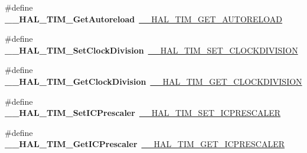 \begin{DoxyCompactItemize}
\item 
\mbox{\label{group___h_a_l___t_i_m___aliased___macros_gae96afd3a280ee1faf2551537e6618ee4}} 
\#define {\bfseries \+\_\+\+\_\+\+H\+A\+L\+\_\+\+T\+I\+M\+\_\+\+Get\+Autoreload}~\mbox{\hyperlink{group___t_i_m___exported___macros_gaa7a5c7645695bad15bacd402513a028a}{\+\_\+\+\_\+\+H\+A\+L\+\_\+\+T\+I\+M\+\_\+\+G\+E\+T\+\_\+\+A\+U\+T\+O\+R\+E\+L\+O\+AD}}
\item 
\mbox{\label{group___h_a_l___t_i_m___aliased___macros_ga8b8f3cf144c4058ec55e6e3659c6a68f}} 
\#define {\bfseries \+\_\+\+\_\+\+H\+A\+L\+\_\+\+T\+I\+M\+\_\+\+Set\+Clock\+Division}~\mbox{\hyperlink{group___t_i_m___exported___macros_ga8aa84d77c670890408092630f9b2bdc4}{\+\_\+\+\_\+\+H\+A\+L\+\_\+\+T\+I\+M\+\_\+\+S\+E\+T\+\_\+\+C\+L\+O\+C\+K\+D\+I\+V\+I\+S\+I\+ON}}
\item 
\mbox{\label{group___h_a_l___t_i_m___aliased___macros_gaaf835e3864f2ba2e2026d417ad0d5e40}} 
\#define {\bfseries \+\_\+\+\_\+\+H\+A\+L\+\_\+\+T\+I\+M\+\_\+\+Get\+Clock\+Division}~\mbox{\hyperlink{group___t_i_m___exported___macros_gae6bc91bb5940bce52828c690f24001b8}{\+\_\+\+\_\+\+H\+A\+L\+\_\+\+T\+I\+M\+\_\+\+G\+E\+T\+\_\+\+C\+L\+O\+C\+K\+D\+I\+V\+I\+S\+I\+ON}}
\item 
\mbox{\label{group___h_a_l___t_i_m___aliased___macros_ga1cb3c9854441539ebe076fba62c36d22}} 
\#define {\bfseries \+\_\+\+\_\+\+H\+A\+L\+\_\+\+T\+I\+M\+\_\+\+Set\+I\+C\+Prescaler}~\mbox{\hyperlink{group___t_i_m___exported___macros_gaeb106399b95ef02cec502f58276a0e92}{\+\_\+\+\_\+\+H\+A\+L\+\_\+\+T\+I\+M\+\_\+\+S\+E\+T\+\_\+\+I\+C\+P\+R\+E\+S\+C\+A\+L\+ER}}
\item 
\mbox{\label{group___h_a_l___t_i_m___aliased___macros_gae8d82e4e04e81f7a023a45b73c9705b7}} 
\#define {\bfseries \+\_\+\+\_\+\+H\+A\+L\+\_\+\+T\+I\+M\+\_\+\+Get\+I\+C\+Prescaler}~\mbox{\hyperlink{group___t_i_m___exported___macros_gabfeec6b3c67a5747c7dbd20aff61d8e2}{\+\_\+\+\_\+\+H\+A\+L\+\_\+\+T\+I\+M\+\_\+\+G\+E\+T\+\_\+\+I\+C\+P\+R\+E\+S\+C\+A\+L\+ER}}
\item 
\mbox{\label{group___h_a_l___t_i_m___aliased___macros_ga03feb77e8c86f3563d671c1ec2439e76}} 

\end{DoxyCompactItemize}
